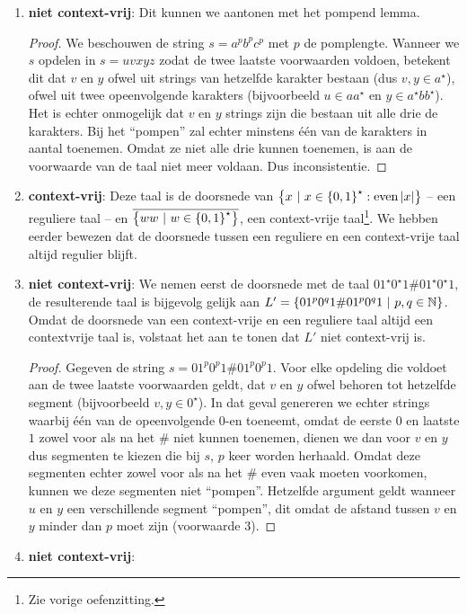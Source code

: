 \documentclass[a4paper]{article}
\begin{document}
\begin{question}
\begin{answer}
\begin{enumerate}
\begin{proof}
\end{proof}
\item \textbf{niet context-vrij}: Dit kunnen we aantonen met het pompend lemma.
\begin{proof}
We beschouwen de string $s=a^pb^pc^p$ met $p$ de pomplengte. Wanneer we $s$ opdelen in $s=uvxyz$ zodat de twee laatste voorwaarden voldoen, betekent dit dat $v$ en $y$ ofwel uit strings van hetzelfde karakter bestaan (dus $v,y\in a^{\star}$), ofwel uit twee opeenvolgende karakters (bijvoorbeeld $u\in aa^{\star}$ en $y\in a^{\star}bb^{\star}$). Het is echter onmogelijk dat $v$ en $y$ strings zijn die bestaan uit alle drie de karakters. Bij het ``pompen'' zal echter minstens \'e\'en van de karakters in aantal toenemen. Omdat ze niet alle drie kunnen toenemen, is aan de voorwaarde van de taal niet meer voldaan. Dus inconsistentie.
\end{proof}
\item \textbf{context-vrij}: Deze taal is de doorsnede van $\left\{ x\ |\ x\in\left\{ 0,1 \right\}^{\star}:\mbox{even}\left|x\right| \right\}$ -- een reguliere taal -- en $\overline{\left\{ ww\ |\ w\in\left\{ 0,1 \right\}^{\star} \right\}}$, een context-vrije taal\footnote{Zie vorige oefenzitting.}. We hebben eerder bewezen dat de doorsnede tussen een reguliere en een context-vrije taal altijd regulier blijft.
\item \textbf{niet context-vrij}: We nemen eerst de doorsnede met de taal $01^{\star}0^{\star}1\#01^{\star}0^{\star}1$, de resulterende taal is bijgevolg gelijk aan $L'=\left\{ 01^p0^q1\#01^p0^q1\ |\ p,q\in\mathbb{N} \right\}$. Omdat de doorsnede van een context-vrije en een reguliere taal altijd een contextvrije taal is, volstaat het aan te tonen dat $L'$ niet context-vrij is.
\begin{proof}
Gegeven de string $s=01^p0^p1\#01^p0^p1$. Voor elke opdeling die voldoet aan de twee laatste voorwaarden geldt, dat $v$ en $y$ ofwel behoren tot hetzelfde segment (bijvoorbeeld $v,y\in 0^{\star}$). In dat geval genereren we echter strings waarbij \'e\'en van de opeenvolgende $0$-en toeneemt, omdat de eerste $0$ en laatste $1$ zowel voor als na het $\#$ niet kunnen toenemen, dienen we dan voor $v$ en $y$ dus segmenten te kiezen die bij $s$, $p$ keer worden herhaald. Omdat deze segmenten echter zowel voor als na het $\#$ even vaak moeten voorkomen, kunnen we deze segmenten niet ``pompen''. Hetzelfde argument geldt wanneer $u$ en $y$ een verschillende segment ``pompen'', dit omdat de afstand tussen $v$ en $y$ minder dan $p$ moet zijn (voorwaarde $3$).
\end{proof}
\item \textbf{niet context-vrij}:

\end{enumerate}
\end{answer}
\end{question}
\end{document}
